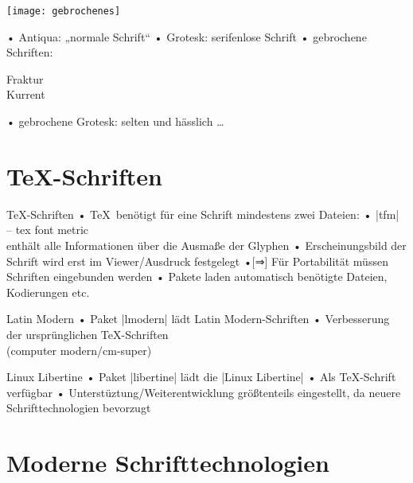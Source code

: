 \begin{frame}[plain]
\parbox[b]{.7\textwidth}{
\texttt{[image: gebrochenes]}%
}%
\parbox[b]{.3\textwidth}{
• Antiqua: \textrm{„normale Schrift“}
• Grotesk: \textsf{serifenlose Schrift}
• gebrochene Schriften: \parbox[t]{5cm}{%
 Fraktur\\%
\large Kurrent
}
• gebrochene Grotesk: selten und hässlich …
\•
\vspace*{2cm}
}
\end{frame}

\section{\TeX-Schriften}
\begin{frame}[fragile]{\TeX-Schriften}
• \TeX\ benötigt für eine Schrift mindestens zwei Dateien:
• |tfm| – tex font metric%
\\ enthält alle Informationen über die Ausmaße der Glyphen
• Erscheinungsbild der Schrift wird erst im Viewer/Ausdruck festgelegt
•[⇒] Für Portabilität müssen Schriften eingebunden werden
• Pakete laden automatisch benötigte Dateien, Kodierungen etc.
\• 
\end{frame}

\begin{frame}[fragile]{Latin Modern}
• Paket |lmodern| lädt Latin Modern-Schriften
• Verbesserung der ursprünglichen \TeX-Schriften\\ (computer modern/cm-super)
\•
\end{frame}

\begin{frame}{Linux Libertine}
• Paket |libertine| lädt die |Linux Libertine|
• Als \TeX-Schrift verfügbar
• Unterstüztung/Weiterentwicklung größtenteils eingestellt, da neuere Schrifttechnologien bevorzugt
\•
\end{frame}

\section{Moderne Schrifttechnologien}


